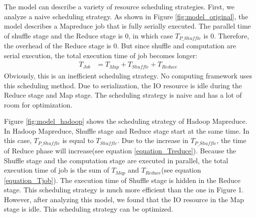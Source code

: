 {The model can describe a variety of resource scheduling strategies. First, we analyze a naive scheduling strategy. As shown in Figure \ref{fig:model_original}, the model describes a Mapreduce job that is fully serially executed. The parallel time of shuffle stage and the Reduce stage is \(0\), in which case \(T_{P\_Shuffle}\) is \(0\). Therefore, the overhead of the Reduce stage is 0. But since shuffle and computation are serial execution, the total execution time of job becomes longer:
\begin{equation}
\label{equation_Tjob}
\begin{aligned}
    T_{Job} &= T_{Map} + T_{Shuffle} + T_{Reduce}
\end{aligned}
\end{equation}
Obviously, this is an inefficient scheduling strategy. No computing framework uses this scheduling method. Due to serialization, the IO resource is idle during the Reduce stage and Map stage. The scheduling strategy is naive and has a lot of room for optimization.

Figure \ref{fig:model_hadoop} shows the scheduling strategy of Hadoop Mapreduce. In Hadoop Mapreduce, Shuffle stage and Reduce stage start at the same time. In this case, \(T_{P\_Shuffle}\) is equal to \(T_{Shuffle}\). Due to the increase in \(T_{P\_Shuffle}\), the time of Reduce phase will increase(see equation \ref{equation_Treduce}). Because the Shuffle stage and the computation stage are executed in parallel, the total execution time of job is the sum of \(T_{Map}\) and \(T_{Reduce}\)(see equation \ref{equation_Tjob}). The execution time of Shuffle stage is hidden in the Reduce stage. This scheduling strategy is much more efficient than the one in Figure 1. However, after analyzing this model, we found that the IO resource in the Map stage is idle. This scheduling strategy can be optimized.

}
